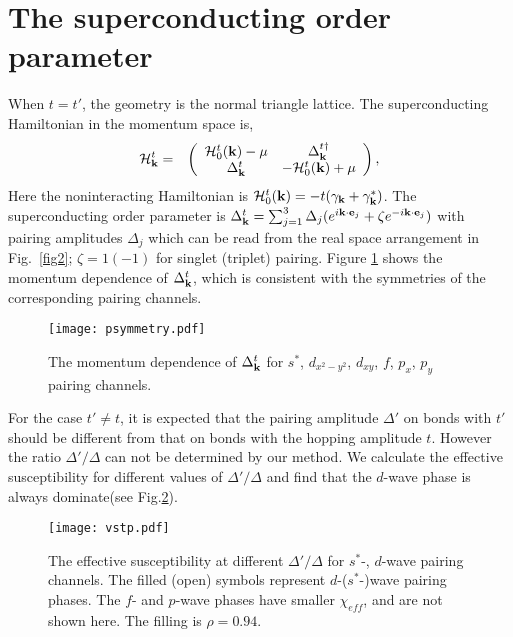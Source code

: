 \documentclass[%
 reprint,
 amsmath,amssymb,
 aps,
]{revtex4-1}
\begin{document}
\section{The superconducting order parameter}
When $t=t'$, the geometry is the normal triangle lattice. The superconducting Hamiltonian in the momentum space is,
\begin{eqnarray}\label{eqb}
{\cal H}_{\bf k}^{t}&=&\left(
                   \begin{array}{cc}
                     {\cal H}_{0}^{t}({\bf k})-\mu & \Delta^{t\dagger}_{\bf k} \\
                     \Delta_{\bf k}^{t} & -{\cal H}_{0}^{t}({\bf k})+\mu \\
                   \end{array}
                 \right),
\end{eqnarray}
Here the noninteracting Hamiltonian is ${\cal H}_{0}^{t}({\bf k})=-t(\gamma_{\bf k}+\gamma^{*}_{\bf k})$. The superconducting order parameter is $\Delta_{\bf k}^{t}=\sum_{j=1}^{3} \Delta_j
(e^{i {\bf k} \cdot {\bf e}_j}+\zeta e^{-i {\bf k} \cdot {\bf e}_j})$ with  pairing amplitudes $\Delta_j$ which can be read from the real space arrangement in Fig.~\ref{fig2}; $\zeta=1 (-1)$ for singlet (triplet) pairing. Figure \ref{fig8} shows the momentum dependence of $\Delta_{\bf k}^{t}$, which is consistent with the symmetries of the corresponding pairing channels.

\begin{figure}[htbp]
\centering \texttt{[image: psymmetry.pdf]} \caption{The momentum dependence of $\Delta_{\bf k}^{t}$ for $s^*$, $d_{x^2-y^2}$, $d_{xy}$, $f$, $p_x$, $p_y$ pairing channels.}
\label{fig8}
\end{figure}

For the case $t'\neq t$, it is expected that the pairing amplitude $\Delta'$ on bonds with $t'$ should be different from that on bonds with the hopping amplitude $t$. However the ratio $\Delta'/\Delta$ can not be determined by our method. We calculate the effective susceptibility for different values of $\Delta'/\Delta$ and find that the $d$-wave phase is always dominate(see Fig.\ref{fig9}).

\begin{figure}[htbp]
\centering \texttt{[image: vstp.pdf]} \caption{The effective susceptibility at different $\Delta'/\Delta$ for $s^*$-, $d$-wave pairing channels. The filled (open) symbols represent $d$-($s^*$-)wave pairing phases. The $f$- and $p$-wave phases have smaller $\chi_{eff}$, and are not shown here. The filling is $\rho=0.94$.}
\label{fig9}
\end{figure}


%
\end{document}
